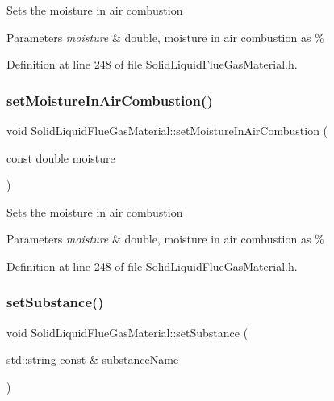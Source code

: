Sets the moisture in air combustion 
\begin{DoxyParams}{Parameters}
{\em moisture} & double, moisture in air combustion as \% \\
\hline
\end{DoxyParams}


Definition at line 248 of file Solid\+Liquid\+Flue\+Gas\+Material.\+h.

\mbox{\label{class_solid_liquid_flue_gas_material_a1a5f1bd3008e78cce62edb8aca642284}} 
\subsubsection{\texorpdfstring{set\+Moisture\+In\+Air\+Combustion()}{setMoistureInAirCombustion()}\hspace{0.1cm}{\footnotesize\ttfamily [3/3]}}
{\footnotesize\ttfamily void Solid\+Liquid\+Flue\+Gas\+Material\+::set\+Moisture\+In\+Air\+Combustion (\begin{DoxyParamCaption}\item[{const double}]{moisture }\end{DoxyParamCaption})\hspace{0.3cm}{\ttfamily [inline]}}

Sets the moisture in air combustion 
\begin{DoxyParams}{Parameters}
{\em moisture} & double, moisture in air combustion as \% \\
\hline
\end{DoxyParams}


Definition at line 248 of file Solid\+Liquid\+Flue\+Gas\+Material.\+h.

\mbox{\label{class_solid_liquid_flue_gas_material_a54be915432c1300c4d8eaf7bf2be361f}} 
\subsubsection{\texorpdfstring{set\+Substance()}{setSubstance()}\hspace{0.1cm}{\footnotesize\ttfamily [1/3]}}
{\footnotesize\ttfamily void Solid\+Liquid\+Flue\+Gas\+Material\+::set\+Substance (\begin{DoxyParamCaption}\item[{std\+::string const \&}]{substance\+Name }\end{DoxyParamCaption})\hspace{0.3cm}{\ttfamily [inline]}}

